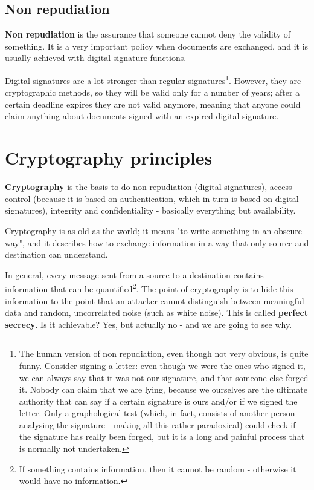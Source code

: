 
\subsection{Non repudiation}
\textbf{Non repudiation} is the assurance that someone cannot deny the validity of something. It is a very important policy when documents are exchanged, and it is usually achieved with digital signature functions.

Digital signatures are a lot stronger than regular signatures\footnote{The human version of non repudiation, even though not very obvious, is quite funny. Consider signing a letter: even though we were the ones who signed it, we can always say that it was not our signature, and that someone else forged it. Nobody can claim that we are lying, because we ourselves are the ultimate authority that can say if a certain signature is ours and/or if we signed the letter. Only a graphological test (which, in fact, consists of another person analysing the signature - making all this rather paradoxical) could check if the signature has really been forged, but it is a long and painful process that is normally not undertaken.}. However, they are cryptographic methods, so they will be valid only for a number of years; after a certain deadline expires they are not valid anymore, meaning that anyone could claim anything about documents signed with an expired digital signature.


\section{Cryptography principles}
\textbf{Cryptography} is the basis to do non repudiation (digital signatures), access control (because it is based on authentication, which in turn is based on digital signatures), integrity and confidentiality - basically everything but availability.

Cryptography is as old as the world; it means "to write something in an obscure way", and it describes how to exchange information in a way that only source and destination can understand.

In general, every message sent from a source to a destination contains information that can be quantified\footnote{If something contains information, then it cannot be random -  otherwise it would have no information.}. The point of cryptography is to hide this information to the point that an attacker cannot distinguish between meaningful data and random, uncorrelated noise (such as white noise). This is called \textbf{perfect secrecy}. Is it achievable? Yes, but actually no - and we are going to see why.

